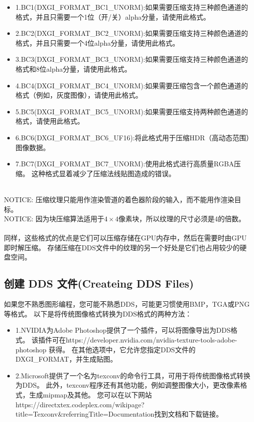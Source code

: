 \begin{itemize} 
  \item 1.BC1(DXGI\_FORMAT\_BC1\_UNORM):如果需要压缩支持三种颜色通道的格式，并且只需要一个1位（开/关）alpha分量，请使用此格式。
  \item 2.BC2(DXGI\_FORMAT\_BC2\_UNORM):如果需要压缩支持三种颜色通道的格式，并且只需要一个4位alpha分量，请使用此格式。
  \item 3.BC3(DXGI\_FORMAT\_BC3\_UNORM):如果需要压缩支持三种颜色通道的格式和8位alpha分量，请使用此格式。
  \item 4.BC4(DXGI\_FORMAT\_BC4\_UNORM):如果需要压缩包含一个颜色通道的格式（例如，灰度图像），请使用此格式。
  \item 5.BC5(DXGI\_FORMAT\_BC5\_UNORM):如果需要压缩支持两种颜色通道的格式，请使用此格式。
  \item 6.BC6(DXGI\_FORMAT\_BC6\_UF16):将此格式用于压缩HDR（高动态范围）图像数据。
  \item 7.BC7(DXGI\_FORMAT\_BC7\_UNORM):使用此格式进行高质量RGBA压缩。 这种格式显着减少了压缩法线贴图造成的错误。
\end{itemize}

\begin{flushleft}
~\\
NOTICE: 压缩纹理只能用作渲染管道的着色器阶段的输入，而不能用作渲染目标。\\
NOTICE: 因为块压缩算法适用于$4\times 4$像素块，所以纹理的尺寸必须是4的倍数。\\
~\\
同样，这些格式的优点是它们可以压缩存储在GPU内存中，然后在需要时由GPU即时解压缩。 存储压缩在DDS文件中的纹理的另一个好处是它们也占用较少的硬盘空间。
\end{flushleft}

\subsection{创建 DDS 文件(Createing DDS Files)}
\begin{flushleft}
如果您不熟悉图形编程，您可能不熟悉DDS，可能更习惯使用BMP，TGA或PNG等格式。 以下是将传统图像格式转换为DDS格式的两种方法：\\
\end{flushleft}

\begin{itemize} 
  \item 1.NVIDIA为Adobe Photoshop提供了一个插件，可以将图像导出为DDS格式。 该插件可在https://developer.nvidia.com/nvidia-texture-tools-adobe-photoshop 获得。 在其他选项中，它允许您指定DDS文件的DXGI\_FORMAT，并生成贴图。
  \item 2.Microsoft提供了一个名为texconv的命令行工具，可用于将传统图像格式转换为DDS。 此外，texconv程序还有其他功能，例如调整图像大小，更改像素格式，生成mipmap及其他。 您可以在以下网站https://directxtex.codeplex.com/wikipage?title=Texconv\&referringTitle=Documentation找到文档和下载链接。
\end{itemize}

